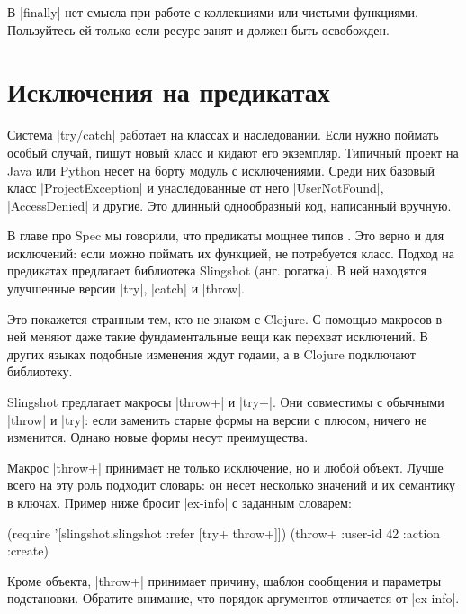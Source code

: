 В \spverb|finally| нет смысла при работе с коллекциями или чистыми
функциями. Пользуйтесь ей только если ресурс занят и должен быть освобожден.

\section{Исключения на предикатах}

Система \spverb|try/catch| работает на классах и наследовании. Если нужно
поймать особый случай, пишут новый класс и кидают его экземпляр. Типичный проект
на Java или Python несет на борту модуль с исключениями. Среди них базовый класс
\spverb|ProjectException| и унаследованные от него \spverb|UserNotFound|,
\spverb|AccessDenied| и другие. Это длинный однообразный код, написанный
вручную.

В главе про Spec мы говорили, что предикаты мощнее типов
. Это верно и для исключений: если можно поймать их
функцией, не потребуется класс. Подход на предикатах предлагает библиотека
Slingshot (анг. рогатка). В ней
находятся улучшенные версии \spverb|try|, \spverb|catch| и \spverb|throw|.

Это покажется странным тем, кто не знаком с Clojure. С помощью макросов в ней
меняют даже такие фундаментальные вещи как перехват исключений. В других языках
подобные изменения ждут годами, а в Clojure подключают библиотеку.

Slingshot предлагает макросы \spverb|throw+| и \spverb|try+|. Они совместимы с
обычными \spverb|throw| и \spverb|try|: если заменить старые формы на версии с
плюсом, ничего не изменится. Однако новые формы несут преимущества.

Макрос \spverb|throw+| принимает не только исключение, но и любой объект. Лучше
всего на эту роль подходит словарь: он несет несколько значений и их семантику в
ключах. Пример ниже бросит \spverb|ex-info| с заданным словарем:

\begin{english}
  \begin{clojure}
(require '[slingshot.slingshot :refer [try+ throw+]])
(throw+ {:user-id 42 :action :create})
  \end{clojure}
\end{english}

Кроме объекта, \spverb|throw+| принимает причину, шаблон сообщения и параметры
подстановки. Обратите внимание, что порядок аргументов отличается от
\spverb|ex-info|.

